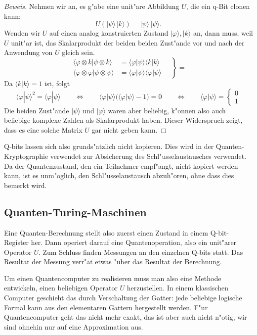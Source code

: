\begin{proof}[Beweis]
Nehmen wir an, es g"abe eine unit"are Abbildung $U$, die ein q-Bit clonen
kann:
\[
U(|\psi\rangle\,|k\rangle)=|\psi\rangle\,|\psi\rangle.
\]
Wenden wir $U$ auf einen analog konstruierten Zustand
$|\varphi\rangle,|k\rangle$ an, dann muss, weil $U$ unit"ar ist,
das Skalarprodukt der beiden beiden Zust"ande vor und nach der Anwendung
von $U$ gleich sein.
\begin{equation}
\left.
\begin{aligned}
\langle\varphi\otimes k|\psi\otimes k\rangle
&=
\langle\varphi|\psi\rangle \langle k|k\rangle
\\
\langle\varphi\otimes\varphi|\psi\otimes\psi\rangle
&=
\langle\varphi|\psi\rangle \langle \varphi|\psi\rangle
\end{aligned}
\quad
\right\}=
\end{equation}
Da $\langle k|k\rangle=1$ ist, folgt
\[
\langle \varphi|\psi\rangle^2=
\langle \varphi|\psi\rangle
\qquad\Leftrightarrow\qquad
\langle \varphi|\psi\rangle ( \langle \varphi|\psi\rangle -1) = 0
\qquad\Leftrightarrow\qquad
\langle \varphi|\psi\rangle =\begin{cases}0\\1\end{cases}
\]
Die beiden Zust"ande $|\psi\rangle$ und $|\varphi\rangle$ waren aber
beliebig, k"onnen also auch beliebige komplexe Zahlen als Skalarprodukt
haben.
Dieser Widerspruch zeigt, dass es eine solche Matrix $U$ gar nicht
geben kann.
\end{proof}

Q-bits lassen sich also grunds"atzlich nicht kopieren.
Dies wird in der Quanten-Kryptographie verwendet zur Absicherung des
Schl"usselaustausches verwendet. 
Da der Quantenzustand, den ein Teilnehmer empf"angt, nicht kopiert
werden kann, ist es unm"oglich, den Schl"usselaustausch abzuh"oren,
ohne dass dies bemerkt wird.

\subsection{Quanten-Turing-Maschinen}
Eine Quanten-Berechnung stellt also zuerst einen Zustand in einem
Q-bit-Register her.
Dann operiert darauf eine Quantenoperation, also ein unit"arer Operator $U$.
Zum Schluss finden Messungen an den einzelnen Q-bits statt.
Das Resultat der Messung verr"at etwas "uber das Resultat der Berechnung.

Um einen Quantencomputer zu realisieren muss man also eine Methode
entwickeln, einen beliebigen Operator $U$ herzustellen.
In einem klassischen Computer geschieht das durch Verschaltung der
Gatter: jede beliebige logische Formal kann aus den elementaren
Gattern hergestellt werden.
F"ur Quantencomputer geht das nicht mehr exakt, das ist aber auch nicht
n"otig, wir sind ohnehin nur auf eine Approximation aus.

